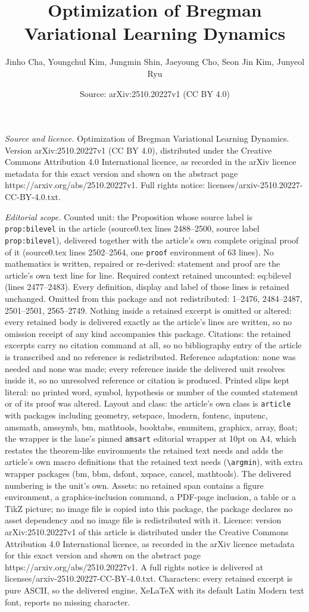 \documentclass[10pt,a4paper]{amsart}
\title[Optimization of Bregman Variational Learning Dynamics]{Optimization of Bregman Variational Learning Dynamics}
\author{Jinho Cha, Youngchul Kim, Jungmin Shin, Jaeyoung Cho, Seon Jin Kim, Junyeol Ryu}
\date{Source: arXiv:2510.20227v1 (CC BY 4.0)}
\begin{document}
\maketitle

\noindent\emph{Source and licence.} Optimization of Bregman Variational Learning Dynamics. Version arXiv:2510.20227v1 (CC BY 4.0), distributed under the Creative Commons Attribution 4.0 International licence, as recorded in the arXiv licence metadata for this exact version and shown on the abstract page https://arxiv.org/abs/2510.20227v1. Full rights notice: licenses/arxiv-2510.20227-CC-BY-4.0.txt.\par\smallskip

\noindent\textit{Editorial scope.} Counted unit: the Proposition whose source label is \texttt{prop:bilevel} in the article (source0.tex lines 2488--2500, source label \texttt{prop:bilevel}), delivered together with the article's own complete original proof of it (source0.tex lines 2502--2564, one \texttt{proof} environment of 63 lines). No mathematics is written, repaired or re-derived: statement and proof are the article's own text line for line. Required context retained uncounted: eq:bilevel (lines 2477--2483). Every definition, display and label of those lines is retained unchanged. Omitted from this package and not redistributed: 1--2476, 2484--2487, 2501--2501, 2565--2749. Nothing inside a retained excerpt is omitted or altered: every retained body is delivered exactly as the article's lines are written, so no omission receipt of any kind accompanies this package. Citations: the retained excerpts carry no citation command at all, so no bibliography entry of the article is transcribed and no reference is redistributed. Reference adaptation: none was needed and none was made; every reference inside the delivered unit resolves inside it, so no unresolved reference or citation is produced. Printed slips kept literal: no printed word, symbol, hypothesis or number of the counted statement or of its proof was altered. Layout and class: the article's own class is \texttt{article} with packages including geometry, setspace, lmodern, fontenc, inputenc, amsmath, amssymb, bm, mathtools, booktabs, enumitem, graphicx, array, float; the wrapper is the lane's pinned \texttt{amsart} editorial wrapper at 10pt on A4, which restates the theorem-like environments the retained text needs and adds the article's own macro definitions that the retained text needs (\texttt{\textbackslash argmin}), with extra wrapper packages (bm, bbm, dsfont, xspace, cancel, mathtools). The delivered numbering is the unit's own. Assets: no retained span contains a figure environment, a graphics-inclusion command, a PDF-page inclusion, a table or a TikZ picture; no image file is copied into this package, the package declares no asset dependency and no image file is redistributed with it. Licence: version arXiv:2510.20227v1 of this article is distributed under the Creative Commons Attribution 4.0 International licence, as recorded in the arXiv licence metadata for this exact version and shown on the abstract page https://arxiv.org/abs/2510.20227v1. A full rights notice is delivered at licenses/arxiv-2510.20227-CC-BY-4.0.txt. Characters: every retained excerpt is pure ASCII, so the delivered engine, XeLaTeX with its default Latin Modern text font, reports no missing character.
\end{document}
